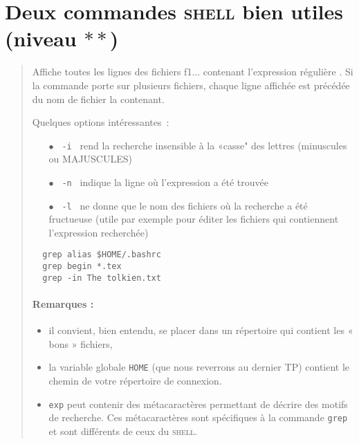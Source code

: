 \documentclass[a4paper,11pt]{article}
\newcommand{\shell}{\textsc{shell}}
\begin{document}
\newpage

\section{Deux commandes \shell{} bien utiles (niveau $**$)}
\label{grep}

\begin{quote}
  Affiche toutes les lignes des fichiers f1...  contenant l'expression
  régulière . Si la commande porte sur plusieurs fichiers, chaque
  ligne affichée est précédée du nom de fichier la contenant.

  Quelques options intéressantes :
  \begin{itemize}
    \item[$\bullet$] \verb+ -i + rend la recherche insensible à la «casse" des
                     lettres (minuscules ou MAJUSCULES)
    \item[$\bullet$] \verb+ -n + indique la ligne où l'expression a été
                     trouvée
    \item[$\bullet$] \verb+ -l + ne donne que le nom des fichiers où la
                     recherche a été fructueuse (utile par exemple pour éditer
                     les fichiers qui contiennent l'expression recherchée)
  \end{itemize}

\begin{verbatim}
  grep alias $HOME/.bashrc
  grep begin *.tex
  grep -in The tolkien.txt
\end{verbatim}

\paragraph{Remarques :} 
\begin{itemize}
  \item il convient, bien entendu, se placer dans un répertoire
        qui contient les « bons » fichiers,
  \item la variable globale \verb+HOME+ (que nous reverrons au dernier TP)
        contient le chemin de votre répertoire de connexion.
  \item \texttt{exp} peut contenir des métacaractères permettant de décrire
        des motifs de recherche. Ces métacaractères sont spécifiques à la
        commande \texttt{grep} et sont différents de ceux du \shell.
\end{itemize}
\end{quote}
\end{document}
